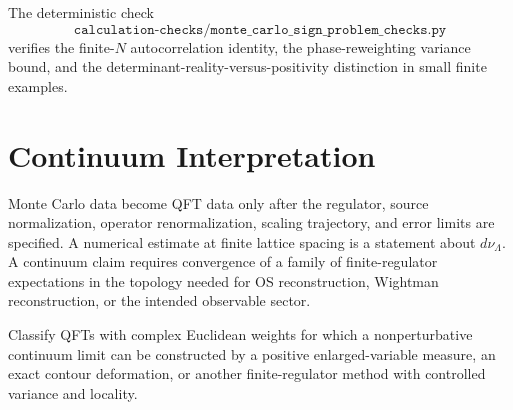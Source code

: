 The deterministic check
\[
  \texttt{calculation-checks/monte\_carlo\_sign\_problem\_checks.py}
\]
verifies the finite-\(N\) autocorrelation identity, the phase-reweighting
variance bound, and the determinant-reality-versus-positivity distinction in
small finite examples.

\section{Continuum Interpretation}

Monte Carlo data become QFT data only after the regulator, source
normalization, operator renormalization, scaling trajectory, and error limits
are specified.  A numerical estimate at finite lattice spacing is a statement
about \(d\nu_\Lambda\).  A continuum claim requires convergence of a family of
finite-regulator expectations in the topology needed for OS reconstruction,
Wightman reconstruction, or the intended observable sector.

\begin{openproblem}
\label{op:sign-problem-continuum-construction}
Classify QFTs with complex Euclidean weights for which a nonperturbative
continuum limit can be constructed by a positive enlarged-variable measure,
an exact contour deformation, or another finite-regulator method with
controlled variance and locality.
\end{openproblem}
